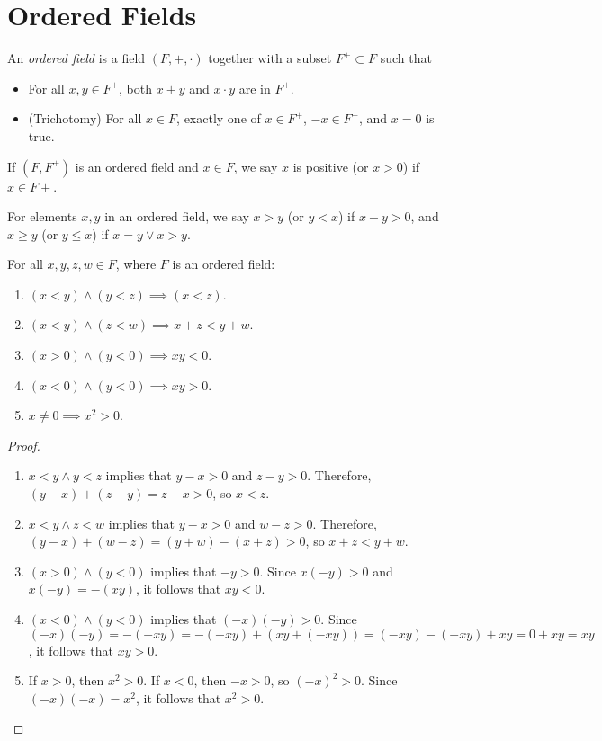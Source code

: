 \section{Ordered Fields}

\begin{defn}
    An \emph{ordered field} is a field $(F, +, \cdot)$ together with a subset $F^+ \subset F$ such that\begin{itemize}
        \item For all $x, y \in F^+$, both $x + y$ and $x \cdot y$ are in $F^+$.
        \item (Trichotomy) For all $x \in F$, exactly one of $x \in F^+$, $-x \in F^+$, and $x = 0$ is true.
    \end{itemize}
\end{defn}

If $(F, F^+)$ is an ordered field and $x \in F$, we say $x$ is positive (or $x > 0$) if $x \in F+$.

\begin{defn}
    For elements $x, y$ in an ordered field, we say $x > y$ (or $y < x$) if $x - y > 0$, and $x \geq y$ (or $y \leq x$) if $x = y \lor x > y$.
\end{defn}

\begin{thm} For all $x, y, z, w \in F$, where $F$ is an ordered field:
    \begin{enumerate}
        \item $(x < y) \land (y < z) \implies (x < z)$.
        \item $(x < y) \land (z < w) \implies x + z < y + w$.
        \item $(x > 0) \land (y < 0) \implies xy < 0$.
        \item $(x < 0) \land (y < 0) \implies xy > 0$.
        \item $x \neq 0 \implies x^2 > 0$.
    \end{enumerate}
\end{thm}

\begin{proof}\proofbreak
    \begin{enumerate}
        \item $x < y \land y < z$ implies that $y - x > 0$ and $z - y > 0$. Therefore, $(y - x) + (z - y) = z - x > 0$, so $x < z$.
        \item $x < y \land z < w$ implies that $y - x > 0$ and $w - z > 0$. Therefore, $(y - x) + (w - z) = (y + w) - (x + z) > 0$, so $x + z < y + w$.
        \item $(x > 0) \land (y < 0)$ implies that $-y > 0$. Since $x(-y) > 0$ and $x(-y) = -(xy)$, it follows that $xy < 0$.
        \item $(x < 0) \land (y < 0)$ implies that $(-x)(-y) > 0$. Since $(-x)(-y) = -(-xy) = -(-xy) + (xy  + (-xy)) = (-xy) - (-xy) + xy = 0 + xy = xy$, it follows that $xy > 0$.
        \item If $x > 0$, then $x^2 > 0$. If $x < 0$, then $-x > 0$, so $(-x)^2 > 0$. Since $(-x)(-x) = x^2$, it follows that $x^2 > 0$.
    \end{enumerate}
\end{proof}

